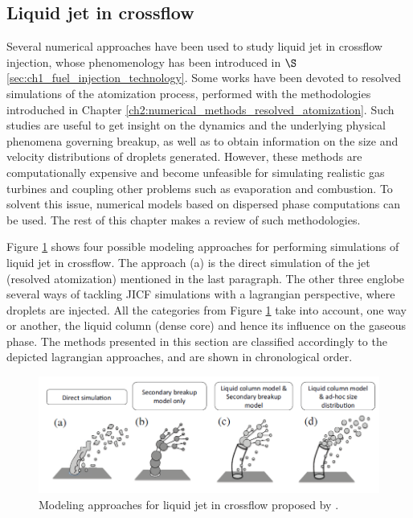 \subsection{Liquid jet in crossflow}

Several numerical approaches have been used to study liquid jet in crossflow injection, whose phenomenology has been introduced in $\S$\ref{sec:ch1_fuel_injection_technology}. Some works  have been devoted to resolved simulations of the atomization process, performed with the methodologies introduched in Chapter \ref{ch2:numerical_methods_resolved_atomization}. Such studies are useful to get insight on the dynamics and the underlying physical phenomena governing breakup, as well as to obtain information on the size and velocity distributions of droplets generated. However, these methods are computationally expensive and become unfeasible for simulating realistic gas turbines and coupling other problems such as evaporation and combustion. To solvent this issue, numerical models based on dispersed phase computations can be used. The rest of this chapter makes a review of such methodologies.

Figure \ref{fig:jaegle_jicf_modeling_approaches} shows four possible modeling approaches for performing simulations of liquid jet in crossflow. The approach (a) is the direct simulation of the jet (resolved atomization) mentioned in the last paragraph. The other three englobe several ways of tackling JICF simulations with a lagrangian perspective, where droplets are injected. All the categories from Figure \ref{fig:jaegle_jicf_modeling_approaches} take into account, one way or another, the liquid column (dense core) and hence its influence on the gaseous phase. The methods presented in this section are classified accordingly to the depicted lagrangian approaches, and are shown in chronological order.

\begin{figure}[ht]
    \centering
    \includegraphics[width=1.0\textwidth]{./part1_numerical_approaches/figures_ch3/modelling_approaches_JICF_Jaegle}
       \centering
    \caption{Modeling approaches for liquid jet in crossflow proposed by .}
    \label{fig:jaegle_jicf_modeling_approaches}
\end{figure}

